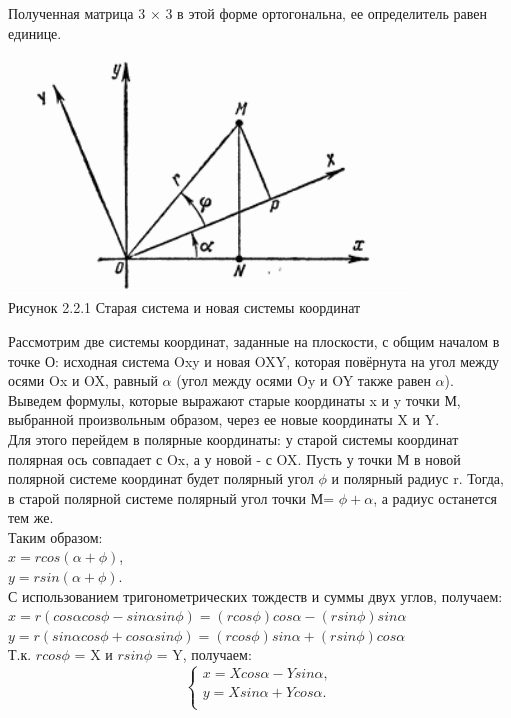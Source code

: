 \hspace*{\parindent}Полученная матрица 3 × 3 в этой форме ортогональна, ее определитель равен единице. 
\begin{center}
    \includegraphics[width=0.8\textwidth]{Lab3/pictures/rotation.png}\\
    Рисунок 2.2.1 Старая система и новая системы координат\\
\end{center}
\hspace*{\parindent} Рассмотрим две системы координат, заданные на плоскости, с общим началом в точке О: исходная система Oxy и новая OXY, которая повёрнута на угол между осями Ox и OX, равный $\alpha$ (угол между осями Oy и OY также равен $\alpha$). Выведем формулы, которые выражают старые координаты x и y точки М, выбранной произвольным образом, через ее новые координаты X и Y.\\
Для этого перейдем в полярные координаты: у старой системы координат полярная ось совпадает с Ox, а у новой - с OX. Пусть у точки М в новой полярной системе координат будет полярный угол $\phi$ и полярный радиус r. Тогда, в старой полярной системе полярный угол точки М= $\phi+\alpha$, а радиус останется тем же.\\
Таким образом: \\
$x=rcos(\alpha+\phi)$,\\
$y=rsin(\alpha+\phi)$.\\
С использованием тригонометрических тождеств и суммы двух углов, получаем:\\
$x=r(cos\alpha cos\phi - sin \alpha sin \phi) = (rcos \phi)cos \alpha - (rsin\phi)sin\alpha$\\
$y=r(sin\alpha cos\phi + cos \alpha sin\phi) = (rcos\phi)sin\alpha + (rsin\phi)cos\alpha$\\
Т.к. $rcos\phi$ = X и $rsin\phi$ = Y, получаем:\\
\begin{equation*}
 \begin{cases}
x=Xcos\alpha - Ysin\alpha,\\
y=Xsin\alpha + Ycos\alpha.\\
 \end{cases}
\end{equation*}\\

